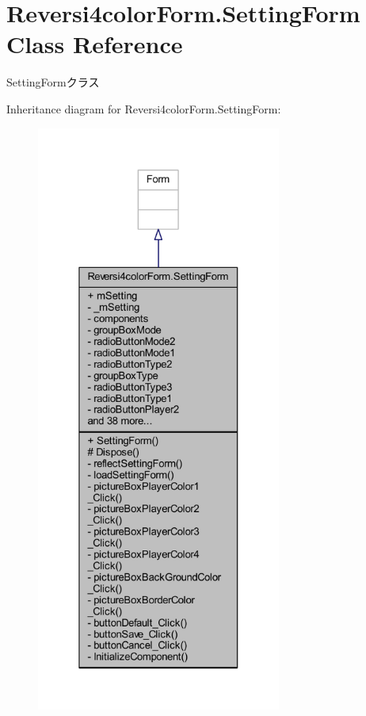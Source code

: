 \hypertarget{class_reversi4color_form_1_1_setting_form}{}\section{Reversi4color\+Form.\+Setting\+Form Class Reference}
\label{class_reversi4color_form_1_1_setting_form}


Setting\+Formクラス  




Inheritance diagram for Reversi4color\+Form.\+Setting\+Form\+:\nopagebreak
\begin{figure}[H]
\begin{center}
\leavevmode
\includegraphics[height=550pt]{class_reversi4color_form_1_1_setting_form__inherit__graph}
\end{center}
\end{figure}



